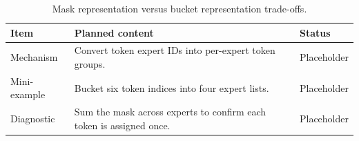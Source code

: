 \begin{table}[H]
\centering
\caption{Mask representation versus bucket representation trade-offs.}
\label{tab:ch04-assignment-masks-and-expert-buckets}
\begin{tabularx}{\textwidth}{p{}X p{}}
\toprule
Item & Planned content & Status \\
\midrule
Mechanism & Convert token expert IDs into per-expert token groups. & Placeholder \\
Mini-example & Bucket six token indices into four expert lists. & Placeholder \\
Diagnostic & Sum the mask across experts to confirm each token is assigned once. & Placeholder \\
\bottomrule
\end{tabularx}
\end{table}
